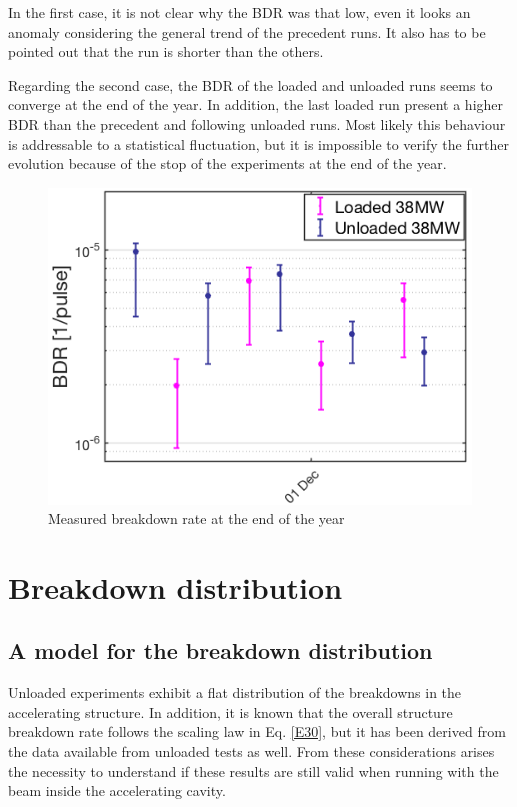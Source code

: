 In the first case, it is not clear why the BDR was that low, even it looks an anomaly considering the general trend of the precedent runs. It also has to be pointed out that the run is shorter than the others.

Regarding the second case, the BDR of the loaded and unloaded runs seems to converge at the end of the year. In addition, the last loaded run present a higher BDR than the precedent and following unloaded runs. Most likely this behaviour is addressable to a statistical fluctuation, but  it is impossible to verify the further evolution because of the stop of the experiments at the end of the year.

\begin{figure}[h]
\centering 
\includegraphics[scale=0.55]{pictures/BDR_last_part_year.png}
\caption{Measured breakdown rate at the end of the year}
\label{BD_prob_last_raise}
\end{figure}





\section[Breakdown distribution]{Breakdown distribution}

\subsection[A model for the breakdown distribution]{A model for the breakdown distribution}

Unloaded experiments exhibit a flat distribution of the breakdowns in the accelerating structure. In addition, it is known that the overall structure breakdown rate follows the scaling law in Eq. \ref{E30}, but it has been derived from the data available from unloaded tests as well. From these considerations arises the necessity to understand if these results are still valid when running with the beam inside the accelerating cavity.

